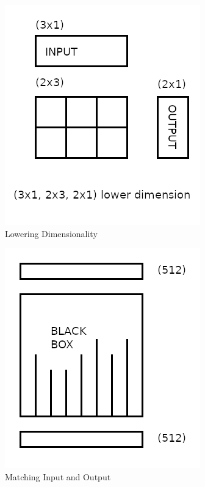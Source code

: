 \begin{figure}[H]
	\begin{center}
		
	
	\includegraphics[scale=0.5]{diagram-mat01}
\end{center}
	\caption[Lowering Dimensionality]{Lowering Dimensionality}
	
\end{figure}

\begin{figure}[H]
	\begin{center}
		
	
	\includegraphics[scale=0.5]{diagram-mat02}
\end{center}
	\caption[Matching Input and Output]{Matching Input and Output}
	
\end{figure}

